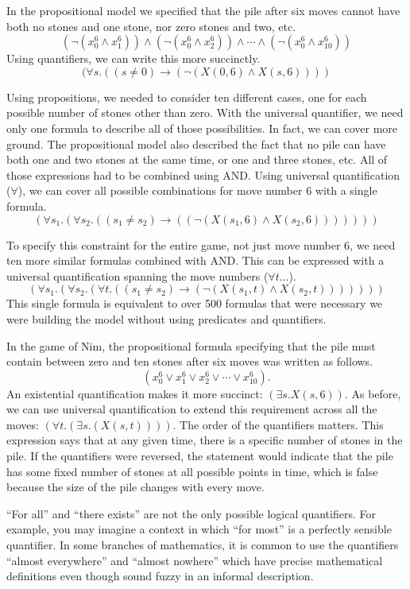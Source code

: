 {In the propositional model we specified that the pile after six moves
cannot have both no stones and one stone, nor zero stones and two, etc.
$$(\neg(x_{0}^{6} \wedge x_{1}^{6})) \wedge (\neg(x_{0}^{6} \wedge x_{2}^{6})) \wedge \cdots \wedge (\neg(x_{0}^{6} \wedge x_{10}^{6}))$$
Using quantifiers, we can write this more succinctly.
$$(\forall s.((s \neq 0) \rightarrow (\neg(X(0, 6) \wedge X(s, 6))))$$

Using propositions, we needed to consider ten
different cases, one for each possible number of stones other than zero. With the
universal quantifier, we need only one formula to describe all of those
possibilities. In fact, we can cover more ground.
The propositional model also described the fact
that no pile can have both one and two stones at the same time, or one and three
stones, etc.  All of those expressions had to be combined using AND.
Using universal quantification ($\forall$),
we can cover all possible combinations
for move number 6 with a single formula.
$$(\forall s_1.(\forall s_2.((s_1 \ne s_2 ) \rightarrow ((\neg(X(s_1, 6) \wedge X(s_2, 6)))))))$$

To specify this constraint for the entire game, not just move number 6,
we need ten more similar formulas combined with AND.
This can be expressed with a universal quantification spanning the move numbers ($\forall t \dots$).
$$(\forall s_1.(\forall s_2.(\forall t.((s_1 \ne s_2) \rightarrow (\neg(X(s_1, t) \wedge X(s_2, t)))))))$$
This single formula is equivalent to over 500 formulas that were
necessary we were building the model without using predicates and quantifiers.

In the game of Nim, the propositional formula specifying that the pile must contain between zero and
ten stones after six moves was written as follows.
$$(x_{0}^{6} \vee x_{1}^{6} \vee x_{2}^{6} \vee \cdots \vee x_{10}^{6}).$$
An existential quantification makes it more succinct: $(\exists s.X(s, 6))$.
As before, we can use universal quantification to extend this requirement
across all the moves:
$(\forall t.(\exists s.(X(s, t))))$.
The order of the quantifiers matters. This expression says that at any given
time, there is a specific number of stones in the pile. If the quantifiers were reversed,
the statement would indicate that the pile has some fixed number of stones
at all possible points in time, which is false because the size of the pile
changes with every move.

\begin{aside}
``For all'' and ``there exists'' are not the only possible logical quantifiers.
For example, you may imagine a context
in which ``for most'' is a perfectly sensible quantifier.
In some branches of mathematics, it is common to use the
quantifiers ``almost everywhere'' and ``almost nowhere''
which have precise mathematical definitions even though
sound fuzzy in an informal description.
\end{aside}

}
